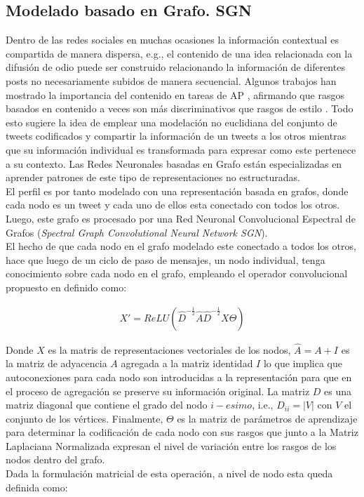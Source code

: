 	\subsection{Modelado basado en Grafo. SGN}\label{sgn}
	
	Dentro de las redes sociales en muchas ocasiones la información contextual es compartida de manera dispersa, e.g., el contenido de una idea relacionada con la difusión de odio puede ser construido relacionando la información de diferentes posts no necesariamente subidos de manera secuencial. Algunos trabajos han mostrado la importancia del contenido en tareas de AP \citep{OrtegaMendoza2018EmphasizingPI}, afirmando que rasgos basados en contenido a veces son más discriminativos que rasgos de estilo \citep{reddy2016survey}. Todo esto sugiere la idea de emplear una modelación no euclidiana del conjunto de tweets codificados y compartir la información de un tweets a los otros mientras que su información individual es transformada para expresar como este pertenece a su contexto.
	Las Redes Neuronales basadas en Grafo están especializadas en aprender patrones de este tipo de representaciones no estructuradas.
	\\
	El perfil es por tanto modelado con una representación basada en grafos, donde cada nodo es un tweet y cada uno de ellos esta conectado con todos los otros. Luego, este grafo es procesado por una Red Neuronal Convolucional Espectral de Grafos (\textit{Spectral Graph Convolutional Neural Network SGN}).
	\\
	El hecho de que cada nodo en el grafo modelado este conectado a todos los otros, hace que luego de un ciclo de paso de mensajes, un nodo individual, tenga conocimiento sobre cada nodo en el grafo, empleando el operador convolucional propuesto en \citep{kipf2017semisupervised} definido como:
	
	\begin{align}\label{matrix-wise}
		X' = ReLU(\hat{D}^{-\frac{1}{2}}\hat{A}\hat{D}^{-\frac{1}{2}}X\Theta)
	\end{align}
	
	Donde $X$ es la matris de representaciones vectoriales de los nodos, $\hat{A} = A + I$ es la matriz de adyacencia $A$ agregada a la matriz identidad $I$ lo que implica que autoconexiones para cada nodo son introducidas a la representación para que en el proceso de agregación se preserve su información original. La matriz $D$ es una matriz diagonal que contiene el grado del nodo $i-esimo$, i.e., $D_{ii} = |V|$ con $V$ el conjunto de los vértices. Finalmente, $\Theta$ es la matriz de parámetros de aprendizaje para determinar la codificación de cada nodo con sus rasgos que junto a la Matriz Laplaciana Normalizada expresan el nivel de variación entre los rasgos de los nodos dentro del grafo.
	\\
	Dada la formulación matricial de esta operación, a nivel de nodo esta queda definida como: 
	

